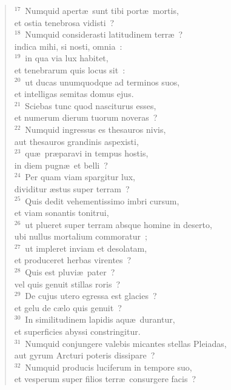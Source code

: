 \begin{flushleft}
\begin{verse}
${}^{17}$~Numquid apert\ae\ sunt tibi port\ae\ mortis,\\ et ostia tenebrosa vidisti~?\\
${}^{18}$~Numquid considerasti latitudinem terr\ae~?\\ indica mihi, si nosti, omnia~:\\
${}^{19}$~in qua via lux habitet,\\ et tenebrarum quis locus sit~:\\
${}^{20}$~ut ducas unumquodque ad terminos suos,\\ et intelligas semitas domus ejus.\\
${}^{21}$~Sciebas tunc quod nasciturus esses,\\ et numerum dierum tuorum noveras~?\\
${}^{22}$~Numquid ingressus es thesauros nivis,\\ aut thesauros grandinis aspexisti,\\
${}^{23}$~qu\ae\ pr\ae paravi in tempus hostis,\\ in diem pugn\ae\ et belli~?\\
${}^{24}$~Per quam viam spargitur lux,\\ dividitur \ae stus super terram~?\\
${}^{25}$~Quis dedit vehementissimo imbri cursum,\\ et viam sonantis tonitrui,\\
${}^{26}$~ut plueret super terram absque homine in deserto,\\ ubi nullus mortalium commoratur~;\\
${}^{27}$~ut impleret inviam et desolatam,\\ et produceret herbas virentes~?\\
${}^{28}$~Quis est pluvi\ae\ pater~?\\ vel quis genuit stillas roris~?\\
${}^{29}$~De cujus utero egressa est glacies~?\\ et gelu de c\ae lo quis genuit~?\\
${}^{30}$~In similitudinem lapidis aqu\ae\ durantur,\\ et superficies abyssi constringitur.\\
${}^{31}$~Numquid conjungere valebis micantes stellas Pleiadas,\\ aut gyrum Arcturi poteris dissipare~?\\
${}^{32}$~Numquid producis luciferum in tempore suo,\\ et vesperum super filios terr\ae\ consurgere facis~?\\

\end{verse}
\end{flushleft}
